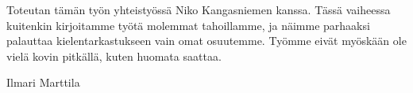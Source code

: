 Toteutan tämän työn yhteistyössä Niko Kangasniemen kanssa. Tässä vaiheessa kuitenkin kirjoitamme työtä molemmat tahoillamme, ja näimme parhaaksi palauttaa kielentarkastukseen vain omat osuutemme. Työmme eivät myöskään ole vielä kovin pitkällä, kuten huomata saattaa.

Ilmari Marttila
